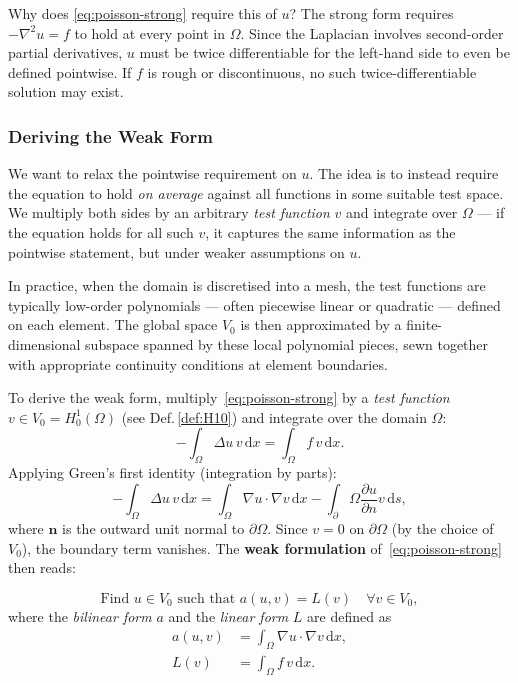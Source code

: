 \documentclass[11pt]{article}
\newcommand{\dx}{\,\mathrm{d}x}
\newcommand{\ds}{\,\mathrm{d}s}
\newcommand{\Grad}{\nabla}
\newcommand{\Lapl}{\Delta}
\newcommand{\domain}{\Omega}
\newcommand{\boundary}{\partial\Omega}
\begin{document}
Why does \eqref{eq:poisson-strong} require this of $u$?
The strong form requires $-\nabla^2 u = f$ to hold at every point in $\Omega$. 
Since the Laplacian involves second-order partial derivatives, $u$ must be 
twice differentiable for the left-hand side to even be defined pointwise. 
If $f$ is rough or discontinuous, no such twice-differentiable 
solution may exist.

 
\subsubsection{Deriving the Weak Form}

We want to relax the pointwise requirement on $u$. 
The idea is to instead require the equation to hold \emph{on average} against 
all functions in some suitable test space. We multiply both sides by an 
arbitrary \emph{test function} $v$ and integrate over $\domain$ --- if the 
equation holds for all such $v$, it captures the same information as the 
pointwise statement, but under weaker assumptions on $u$.

In practice, when the domain is discretised into a mesh, the test functions 
are typically low-order polynomials --- often piecewise linear or quadratic 
--- defined on each element. The global space $V_0$ is then approximated by 
a finite-dimensional subspace spanned by these local polynomial pieces, 
sewn together with appropriate continuity conditions at element boundaries.

To derive the weak form, multiply~\eqref{eq:poisson-strong} by a \emph{test function}
$v \in V_0 = H^1_0(\domain)$ (see Def.\,\vref{def:H10}) and integrate over the domain $\domain$:
\begin{equation*}
  -\int_\domain \Lapl u\, v \dx = \int_\domain f\, v \dx.
\end{equation*}
Applying Green's first identity (integration by parts):
\begin{equation*}
  -\int_\domain \Lapl u\, v \dx
    = \int_\domain \Grad u \cdot \Grad v \dx
      - \int_\boundary \frac{\partial u}{\partial n} v \ds,
\end{equation*}
where $\mathbf{n}$ is the outward unit normal to $\boundary$.
Since $v = 0$ on $\boundary$ (by the choice of $V_0$), the boundary term
vanishes.
The \textbf{weak formulation} of~\eqref{eq:poisson-strong} then reads:

\begin{equation}
  \label{eq:poisson-weak}
  \text{Find } u \in V_0 \text{ such that }
  a(u, v) = L(v) \quad \forall v \in V_0,
\end{equation}
where the \emph{bilinear form} $a$ and the \emph{linear form} $L$ are defined
as
\begin{align}
  a(u, v) &= \int_\domain \Grad u \cdot \Grad v \dx, \label{eq:bilinear}\\
  L(v)    &= \int_\domain f\, v \dx.               \label{eq:linear}
\end{align}
\end{document}
